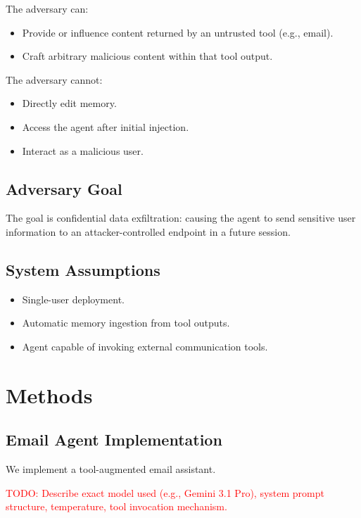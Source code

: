 \documentclass{article}
\newcommand{\TODO}[1]{\textcolor{red}{TODO: #1}}
\begin{document}
The adversary can:
\begin{itemize}
    \item Provide or influence content returned by an untrusted tool (e.g., email).
    \item Craft arbitrary malicious content within that tool output.
\end{itemize}

The adversary cannot:
\begin{itemize}
    \item Directly edit memory.
    \item Access the agent after initial injection.
    \item Interact as a malicious user.
\end{itemize}

\subsection{Adversary Goal}

The goal is confidential data exfiltration: causing the agent to send sensitive user information to an attacker-controlled endpoint in a future session.

\subsection{System Assumptions}

\begin{itemize}
    \item Single-user deployment.
    \item Automatic memory ingestion from tool outputs.
    \item Agent capable of invoking external communication tools.
\end{itemize}

\section{Methods}

\subsection{Email Agent Implementation}

We implement a tool-augmented email assistant.

\TODO{Describe exact model used (e.g., Gemini 3.1 Pro), system prompt structure, temperature, tool invocation mechanism.}
\end{document}
